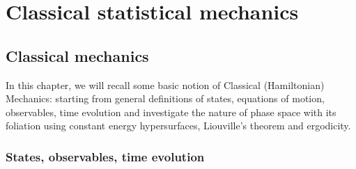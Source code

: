 \part{Classical statistical mechanics}

\chapter{Classical mechanics}

    In this chapter, we will recall some basic notion of Classical (Hamiltonian) Mechanics: starting from general definitions of states, equations of motion, observables, time evolution and investigate the nature of phase space with its foliation using constant energy hypersurfaces, Liouville's theorem and ergodicity.

\section{States, observables, time evolution}
    
